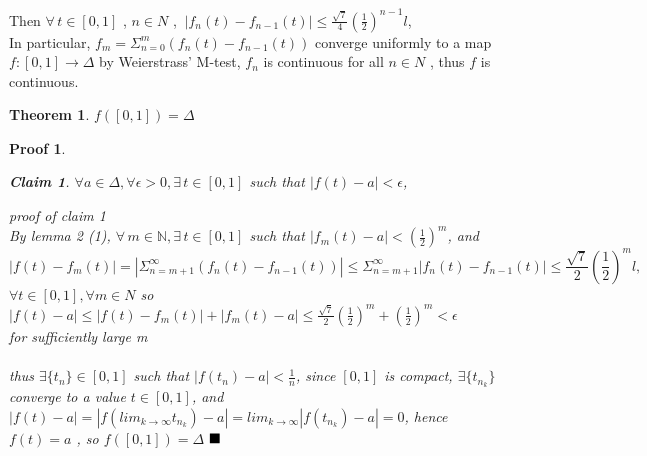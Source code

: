 \documentclass[12pt, a4paper]{article}
\newtheorem{clm}{Claim}
\newtheorem{pf}{Proof}
\newtheorem{thm}{Theorem}
\begin{document}
Then $\forall\, t\in[0,1]$ , $n\in N$ , $\ |f_{n}(t)-f_{n-1}(t)|\leq\frac{\sqrt{7}}{4}(\frac{1}{2})^{n-1}l$,\\In particular, $f_{m}=\Sigma_{n=0}^{m}(f_{n}(t)-f_{n-1}(t))$ converge uniformly to a map $f:[0,1]\rightarrow\Delta$ by Weierstrass' M-test, $f_{n}$ is continuous for all $n \in N$ , thus $f$ is continuous.
\begin{thm}
$f([0,1])=\Delta$
\end{thm}
\begin{pf}
\begin{clm}
$\forall a\in\Delta,\forall \epsilon > 0,\exists\, t\in[0,1]$ such that $|f(t)-a|<\epsilon$,
\end{clm}
proof of claim 1\\
By lemma 2 (1), $\forall\, m\in\mathbb{N},\exists\,t \in [0,1]$ such that $|f_{m}(t)-a|<(\frac{1}{2})^{m}$, and $$|f(t)-f_{m}(t)|=|\Sigma_{n=m+1}^{\infty}(f_{n}(t)-f_{n-1}(t))| \leq\Sigma_{n=m+1}^{\infty}|f_{n}(t)-f_{n-1}(t)|\leq\frac{\sqrt{7}}{2}(\frac{1}{2})^{m}l,$$$\forall t\in [0,1],\forall m\in N$
so $|f(t)-a|\leq|f(t)-f_{m}(t)|+|f_{m}(t)-a|\leq\frac{\sqrt{7}}{2}(\frac{1}{2})^{m}+(\frac{1}{2})^{m}<\epsilon $\\for sufficiently  large m\\\\
thus $\exists\{t_{n}\}\in [0,1]$ such that $|f(t_{n})-a|<\frac{1}{n}$, since $[0,1]$ is compact, $\exists \{t_{n_{k}}\}$ converge to a value $t\in [0,1]$, and
$|f(t)-a|=|f(lim_{k\rightarrow\infty}t_{n_{k}})-a|=lim_{k\rightarrow\infty}|f(t_{n_{k}})-a|=0$, hence $f(t)=a$ , so $f([0,1])=\Delta$ 
$\hfill\blacksquare$

\end{pf}
\end{document}
